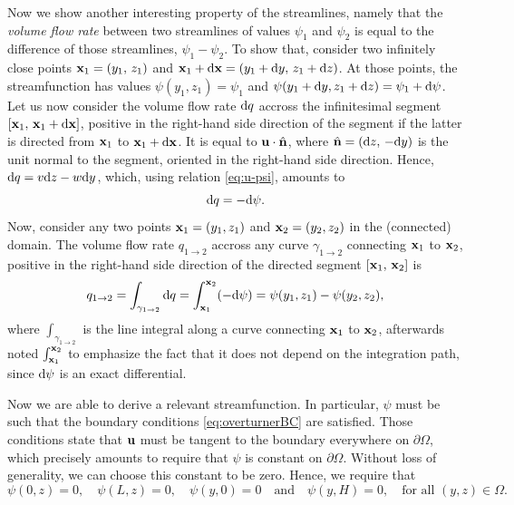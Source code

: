 \begin{tcolorbox}[title=Some properties of the streamfunction]
Now we show another interesting property of the streamlines, namely that the \textit{volume flow rate} between two streamlines of values $\psi_1$ and $\psi_2$ is equal to the difference of those streamlines, $\psi_1 - \psi_2$. To show that, consider two infinitely close points $\b x_1 = (y_1,\, z_1)$ and $\b x_1 + \rm d \b x = (y_1 + \rm dy,\, z_1 + \rm dz)$. At those points, the streamfunction has values $\psi(y_1,z_1) = \psi_1$ and $\psi(y_1+\rm dy,z_1 + \rm dz) = \psi_1 + \rm d\psi$. Let us now consider the volume flow rate $\rm dq$ accross the infinitesimal segment $[\b x_1,\, \b x_1 + \rm d \b x]$, positive in the right-hand side direction of the segment if the latter is directed from $\b x_1$ to $\b x_1 + \rm d \b x$. It is equal to $\b u \cdot \hat{\b{n}}$, where $\hat{\b{n}} = (\rm dz,\,-\rm dy)$ is the unit normal to the segment, oriented in the right-hand side direction. Hence, $\rm dq = v \rm dz - w \rm dy$, which, using relation \eqref{eq:u-psi}, amounts to
\begin{equation}
	\rm dq = - \rm d\psi.
\end{equation}
Now, consider any two points $\b x_1 = (y_1, z_1)$ and $\b x_2 = (y_2, z_2)$ in the (connected) domain. The volume flow rate $q_{1 \rightarrow 2}$ accross any curve $\gamma_{1 \rightarrow 2}$ connecting $\b x_1$ to $\b x_2$, positive in the right-hand side direction of the directed segment $[\b x_1,\, \b x_2]$ is
\begin{equation}
	q_{1 \rightarrow 2} = \int_{\gamma_{1 \rightarrow 2}} \rm dq = \int_{\b x_1}^{\b x_2} (-\rm d\psi) = \psi(y_1,z_1) - \psi(y_2,z_2), 	
\end{equation} 
where $\int_{\gamma_{1 \rightarrow 2}}$ is the line integral along a curve connecting $\b x_1$ to $\b x_2$, afterwards noted $\int_{\b x_1}^{\b x_2}$ to emphasize the fact that it does not depend on the integration path, since $\rm d\psi$ is an exact differential.
\end{tcolorbox}
Now we are able to derive a relevant streamfunction. In particular, $\psi$ must be such that the boundary conditions \eqref{eq:overturnerBC} are satisfied. Those conditions state that $\b u$ must be tangent to the boundary everywhere on $\partial \Omega$, which precisely amounts to require that $\psi$ is constant on $\partial \Omega$. Without loss of generality, we can choose this constant to be zero. Hence, we require that 
\begin{equation}
	\psi(0,z) = 0, \quad \psi(L,z) = 0, \quad \psi(y,0) = 0 \quad \mbox{and} \quad \psi(y,H) = 0, \quad \mbox{for all $(y,z) \in \Omega$}.
\end{equation}

